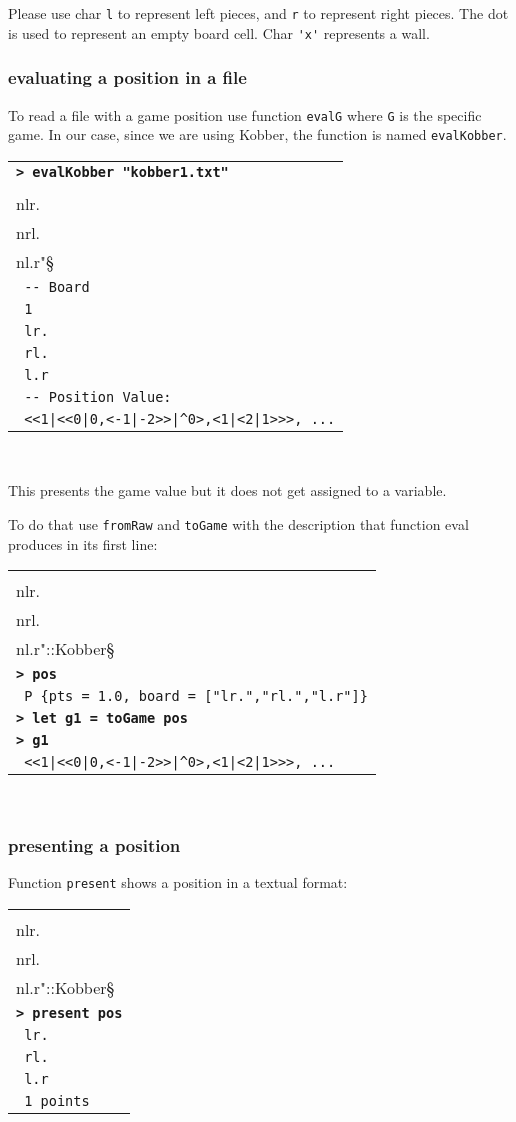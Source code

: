 \documentclass[a4paper,12pt]{article}
\newcommand{\bash}[1]{\small\textbf{\lstinline§> #1§}\\}
\newcommand{\out}[1]{\small\lstinline§ #1§}
\newcommand{\haskellCode}{\fontfamily{pcr}\selectfont}
\newenvironment{sgcode}
	{ \haskellCode
	  \begin{tabular}{|p{0.9\textwidth}|}
      \hline	
	}
	{ \\\hline  
      \end{tabular} \\
	  \par 
	}
\begin{document}
Please use char \verb!l! to represent left pieces, and \verb!r! to represent right 
pieces. The dot is used to represent an empty board cell. Char \verb!'x'! represents a wall.

\subsubsection{evaluating a position in a file}

To read a file with a game position use function \verb!evalG! where \verb!G! is the specific game. In our case, since
we are using Kobber, the function is named \verb!evalKobber!.

\begin{sgcode}
\bash{evalKobber "kobber1.txt"}
\out{-- Read: "1\\nlr.\\nrl.\\nl.r"} \\
\out{-- Board} \\
\out{1} \\
\out{lr.} \\
\out{rl.} \\
\out{l.r} \\
\out{-- Position Value:} \\
\out{<<1|<<0|0,<-1|-2>>|^0>,<1|<2|1>>>, ...} 
\end{sgcode}

This presents the game value but it does not get assigned to a variable. 

To do that use \verb|fromRaw| and \verb|toGame| with the description that function eval produces in its first line:

\begin{sgcode}
\bash{let pos = fromRaw "1\\nlr.\\nrl.\\nl.r"::Kobber}
\bash{pos}
\out{P {pts = 1.0, board = ["lr.","rl.","l.r"]}} \\
\bash{let g1 = toGame pos}
\bash{g1}
\out{<<1|<<0|0,<-1|-2>>|^0>,<1|<2|1>>>, ...}
\end{sgcode}

\subsubsection{presenting a position}

Function \verb!present! shows a position in a textual format:

\begin{sgcode}
\bash{let pos = fromRaw "1\\nlr.\\nrl.\\nl.r"::Kobber}
\bash{present pos}
\out{lr.} \\
\out{rl.} \\
\out{l.r} \\
\out{1 points} 
\end{sgcode}
\end{document}
